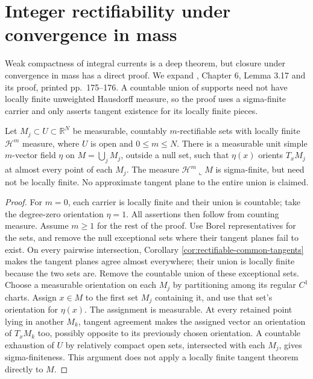 \chapter{Integer rectifiability under convergence in mass}\label{sec:integer-current-mass-closure}
Weak compactness of integral currents is a deep theorem, but closure under convergence in mass has a direct proof. We expand \cite{Sim18}, Chapter 6, Lemma 3.17 and its proof, printed pp.~175--176. A countable union of supports need not have locally finite unweighted Hausdorff measure, so the proof uses a sigma-finite carrier and only asserts tangent existence for its locally finite pieces.

\begin{lemma}\label{lem:common-countable-current-carrier}
Let $M_j\subset U\subset\mathbb R^N$ be measurable, countably $m$-rectifiable sets with locally finite $\mathcal H^m$ measure, where $U$ is open and $0\leq m\leq N$. There is a measurable unit simple $m$-vector field $\eta$ on $M=\bigcup_jM_j$, outside a null set, such that $\eta(x)$ orients $T_xM_j$ at almost every point of each $M_j$. The measure $\mathcal H^m\llcorner M$ is sigma-finite, but need not be locally finite. No approximate tangent plane to the entire union is claimed.
\end{lemma}
\begin{proof}
For $m=0$, each carrier is locally finite and their union is countable; take the degree-zero orientation $\eta=1$. All assertions then follow from counting measure. Assume $m\geq1$ for the rest of the proof. Use Borel representatives for the sets, and remove the null exceptional sets where their tangent planes fail to exist. On every pairwise intersection, Corollary \ref{cor:rectifiable-common-tangents} makes the tangent planes agree almost everywhere; their union is locally finite because the two sets are. Remove the countable union of these exceptional sets. Choose a measurable orientation on each $M_j$ by partitioning among its regular $C^1$ charts. Assign $x\in M$ to the first set $M_j$ containing it, and use that set's orientation for $\eta(x)$. The assignment is measurable. At every retained point lying in another $M_k$, tangent agreement makes the assigned vector an orientation of $T_xM_k$ too, possibly opposite to its previously chosen orientation. A countable exhaustion of $U$ by relatively compact open sets, intersected with each $M_j$, gives sigma-finiteness. This argument does not apply a locally finite tangent theorem directly to $M$.
\end{proof}

